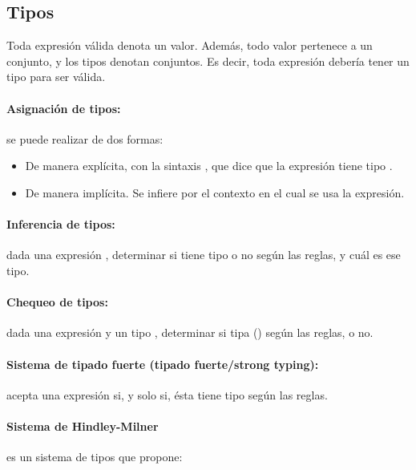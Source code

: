 \subsection{Tipos}

Toda expresión válida denota un valor. Además, todo valor pertenece a un conjunto, y los tipos denotan conjuntos.
Es decir, toda expresión debería tener un tipo para ser válida.

\paragraph{Asignación de tipos:} se puede realizar de dos formas:

\begin{itemize}
  \item De manera explícita, con la sintaxis , que dice que la expresión  tiene tipo .
  \item De manera implícita. Se infiere por el contexto en el cual se usa la expresión.
\end{itemize}

\paragraph{Inferencia de tipos:} dada una expresión , determinar si tiene tipo o no según las reglas, y cuál es ese tipo.

\paragraph{Chequeo de tipos:} dada una expresión  y un tipo , determinar si  tipa  () según las reglas, o no.

\paragraph{Sistema de tipado fuerte (tipado fuerte/strong typing):} acepta una expresión si, y solo si, ésta tiene tipo según las reglas.

\paragraph{Sistema de Hindley-Milner} es un sistema de tipos que propone:


